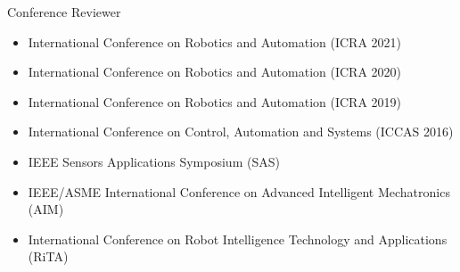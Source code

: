 \documentclass[a4paper,10pt]{article}
\newlength{\cvcolumngapwidth}
\newlength{\cvleftcolumnwidth}
\newlength{\cvrightcolumnwidth}
\newcommand{\cvsectionstyle}[1]{{\normalsize\cvsectionfont\textcolor{cvsectioncolor}{#1}}}
\newcommand{\cvheadingstyle}[1]{{\normalsize\cvheadingfont\textcolor{cvheadingcolor}{#1}}}
\newlength{\cvafteritemskipamount}
\newlength{\cvaftersectionskipamount}
\newlength{\cvbetweensectionandheadingextraskipamount}
\newlength{\cvparskip}
\newcommand{\cvsection}[1]{
    \begin{minipage}[t]{\cvleftcolumnwidth}
        \raggedleft\cvsectionstyle{#1}
    \end{minipage}%
    \hspace{\cvcolumngapwidth}%
    \begin{minipage}[t]{\cvrightcolumnwidth}
        \textcolor{cvrulecolor}{\rule{\cvrightcolumnwidth}{0.3mm}}
    \end{minipage}

    \vspace{\cvaftersectionskipamount}
}
\newcommand{\cvitem}[2]{
    \begin{minipage}[t]{\cvleftcolumnwidth}
        \raggedleft #1
    \end{minipage}%
    \hspace{\cvcolumngapwidth}%
    \begin{minipage}[t]{\cvrightcolumnwidth}
        \setlength{\parskip}{\cvparskip} #2
    \end{minipage}

    \vspace{\cvafteritemskipamount}
}
\begin{document}
\cvitem{
    \cvheadingstyle{Conference Reviewer}
}{
    
    \begin{itemize}
    \item International Conference on Robotics and Automation (ICRA 2021)
    \item International Conference on Robotics and Automation (ICRA 2020)
    \item International Conference on Robotics and Automation (ICRA 2019)
    \item International Conference on Control, Automation and Systems (ICCAS 2016)
    \item IEEE Sensors Applications Symposium (SAS)
    \item IEEE/ASME International Conference on Advanced Intelligent Mechatronics (AIM)
    \item International Conference on Robot Intelligence Technology and Applications (RiTA)
            
    \end{itemize}

    
}











    

    


    
\end{document}
